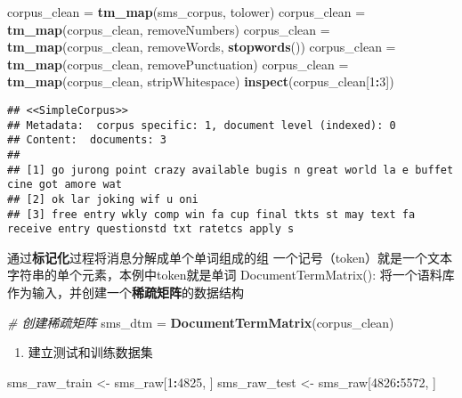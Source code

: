 \documentclass[]{article}
\newenvironment{Shaded}{\begin{snugshade}}{\end{snugshade}}
\newcommand{\KeywordTok}[1]{\textcolor[rgb]{0.13,0.29,0.53}{\textbf{#1}}}
\newcommand{\DecValTok}[1]{\textcolor[rgb]{0.00,0.00,0.81}{#1}}
\newcommand{\StringTok}[1]{\textcolor[rgb]{0.31,0.60,0.02}{#1}}
\newcommand{\CommentTok}[1]{\textcolor[rgb]{0.56,0.35,0.01}{\textit{#1}}}
\newcommand{\OperatorTok}[1]{\textcolor[rgb]{0.81,0.36,0.00}{\textbf{#1}}}
\newcommand{\NormalTok}[1]{#1}
\providecommand{\tightlist}{%
  \setlength{\itemsep}{0pt}\setlength{\parskip}{0pt}}
\begin{document}
\begin{Shaded}
\begin{Highlighting}[]
\NormalTok{corpus_clean =}\StringTok{ }\KeywordTok{tm_map}\NormalTok{(sms_corpus, tolower)}
\NormalTok{corpus_clean =}\StringTok{ }\KeywordTok{tm_map}\NormalTok{(corpus_clean, removeNumbers)}
\NormalTok{corpus_clean =}\StringTok{ }\KeywordTok{tm_map}\NormalTok{(corpus_clean, removeWords, }\KeywordTok{stopwords}\NormalTok{())}
\NormalTok{corpus_clean =}\StringTok{ }\KeywordTok{tm_map}\NormalTok{(corpus_clean, removePunctuation)}
\NormalTok{corpus_clean =}\StringTok{ }\KeywordTok{tm_map}\NormalTok{(corpus_clean, stripWhitespace)}
\KeywordTok{inspect}\NormalTok{(corpus_clean[}\DecValTok{1}\OperatorTok{:}\DecValTok{3}\NormalTok{])}
\end{Highlighting}
\end{Shaded}

\begin{verbatim}
## <<SimpleCorpus>>
## Metadata:  corpus specific: 1, document level (indexed): 0
## Content:  documents: 3
## 
## [1] go jurong point crazy available bugis n great world la e buffet cine got amore wat                     
## [2] ok lar joking wif u oni                                                                                
## [3] free entry wkly comp win fa cup final tkts st may text fa receive entry questionstd txt ratetcs apply s
\end{verbatim}

通过\textbf{标记化}过程将消息分解成单个单词组成的组
一个记号（token）就是一个文本字符串的单个元素，本例中token就是单词
DocumentTermMatrix():
将一个语料库作为输入，并创建一个\textbf{稀疏矩阵}的数据结构

\begin{Shaded}
\begin{Highlighting}[]
\CommentTok{# 创建稀疏矩阵}
\NormalTok{sms_dtm =}\StringTok{ }\KeywordTok{DocumentTermMatrix}\NormalTok{(corpus_clean)}
\end{Highlighting}
\end{Shaded}

\begin{enumerate}
\def\labelenumi{\arabic{enumi}.}
\tightlist
\item
  建立测试和训练数据集
\end{enumerate}

\begin{Shaded}
\begin{Highlighting}[]
\NormalTok{sms_raw_train <-}\StringTok{ }\NormalTok{sms_raw[}\DecValTok{1}\OperatorTok{:}\DecValTok{4825}\NormalTok{, ]}
\NormalTok{sms_raw_test <-}\StringTok{ }\NormalTok{sms_raw[}\DecValTok{4826}\OperatorTok{:}\DecValTok{5572}\NormalTok{, ]}
\end{Highlighting}
\end{Shaded}
\end{document}
